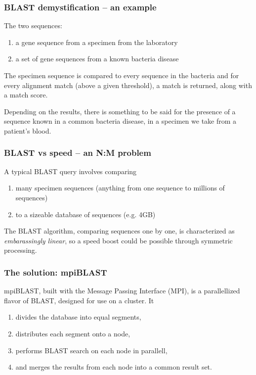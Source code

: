 \documentclass{beamer}
\begin{document}
\begin{frame}
  \frametitle{BLAST demystification -- an example}

	The two sequences:
  \begin{enumerate}
  	\item a gene sequence from a specimen from the laboratory
  	\item a set of gene sequences from a known bacteria disease
  \end{enumerate}
	\bigskip
	
	The specimen sequence is compared to every sequence in the bacteria and for every alignment match (above a given threshold), a match is returned, along with a match score.
	\bigskip
	
	Depending on the results, there is something to be said for the presence of a sequence known in a common bacteria disease, in a specimen we take from a patient's blood.
\end{frame}


\begin{frame}
  \frametitle{BLAST vs speed -- an N:M problem}

	A typical BLAST query involves comparing
  \begin{enumerate}
  	\item many specimen sequences (anything from one sequence to millions of sequences)
  	\item to a sizeable database of sequences (e.g. 4GB)
  \end{enumerate}
  \bigskip
  
  The BLAST algorithm, comparing sequences one by one, is characterized as {\it embarassingly linear}, so a speed boost could be possible through symmetric processing.
\end{frame}


\begin{frame}
  \frametitle{The solution: mpiBLAST}

	mpiBLAST, built with the Message Passing Interface (MPI), is a parallellized flavor of BLAST, designed for use on a cluster. It
  \begin{enumerate}
  	\item divides the database into equal segments,
  	\item distributes each segment onto a node,
  	\item performs BLAST search on each node in parallell,
  	\item and merges the results from each node into a common result set.
  \end{enumerate}	
\end{frame}
\end{document}
